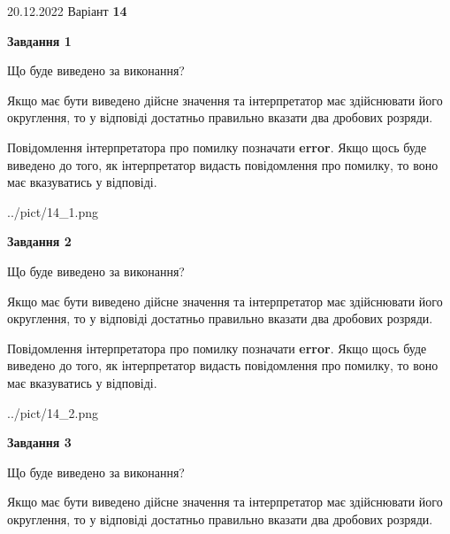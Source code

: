 \documentclass[12pt, ukrainian]{article}
\begin{document}
{20.12.2022 Варіант \No \textbf { 14 }\par}
{
\begin {Large}

{\begin {center}\textbf{Завдання 1}\end {center}}\par
Що буде виведено за виконання? \par

Якщо має бути виведено дійсне значення та інтерпретатор має здійснювати його округлення, 
то у відповіді достатньо правильно вказати два дробових розряди.

Повідомлення інтерпретатора про помилку позначати \textbf{error}.
Якщо щось буде виведено до того, як інтерпретатор видасть повідомлення про помилку, 
то воно має вказуватись у відповіді. \par

\begin{center}
	{../pict/14_1.png}
\end{center}
\newpage

{\begin {center}\textbf{Завдання 2}\end {center}}\par
Що буде виведено за виконання? \par

Якщо має бути виведено дійсне значення та інтерпретатор має здійснювати його округлення, 
то у відповіді достатньо правильно вказати два дробових розряди.

Повідомлення інтерпретатора про помилку позначати \textbf{error}.
Якщо щось буде виведено до того, як інтерпретатор видасть повідомлення про помилку, 
то воно має вказуватись у відповіді. \par

\begin{center}
	{../pict/14_2.png}
\end{center}
\newpage

{\begin {center}\textbf{Завдання 3}\end {center}}\par
Що буде виведено за виконання? \par

Якщо має бути виведено дійсне значення та інтерпретатор має здійснювати його округлення, 
то у відповіді достатньо правильно вказати два дробових розряди.


\end{Large}}
\end{document}
